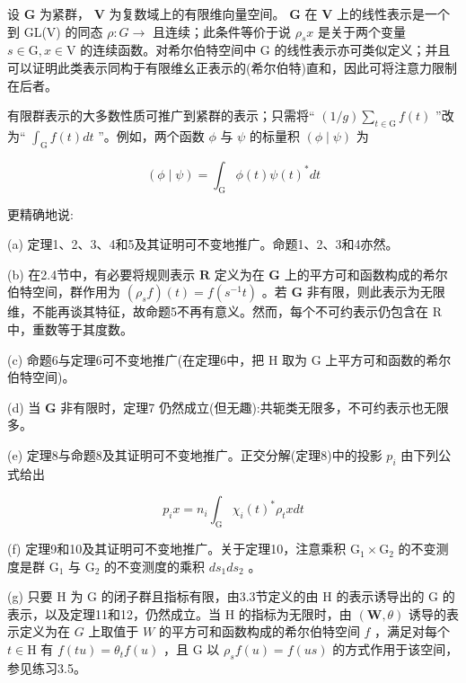\documentclass[10pt]{article}
\begin{document}
设 \(\mathbf{G}\) 为紧群， \(\mathbf{V}\) 为复数域上的有限维向量空间。 \(\mathbf{G}\) 在 \(\mathbf{V}\) 上的线性表示是一个到 GL(V) 的同态 \(\rho  : G \rightarrow\) 且连续；此条件等价于说 \({\rho }_{s}x\) 是关于两个变量 \(s \in  \mathrm{G},x \in  \mathrm{V}\) 的连续函数。对希尔伯特空间中 \(\mathrm{G}\) 的线性表示亦可类似定义；并且可以证明此类表示同构于有限维幺正表示的(希尔伯特)直和，因此可将注意力限制在后者。

有限群表示的大多数性质可推广到紧群的表示；只需将“ \(\left( {1/g}\right) \mathop{\sum }\limits_{{t \in  \mathrm{G}}}f\left( t\right)\) ”改为“ \({\int }_{\mathrm{G}}f\left( t\right) {dt}\) ”。例如，两个函数 \(\phi\) 与 \(\psi\) 的标量积 \(\left( {\phi  \mid  \psi }\right)\) 为

\[
\left( {\phi  \mid  \psi }\right)  = {\int }_{\mathrm{G}}\phi \left( t\right) \psi {\left( t\right) }^{ * }{dt}
\]

更精确地说:

(a) 定理1、2、3、4和5及其证明可不变地推广。命题1、2、3和4亦然。

(b) 在2.4节中，有必要将规则表示 \(\mathbf{R}\) 定义为在 \(\mathbf{G}\) 上的平方可和函数构成的希尔伯特空间，群作用为 \(\left( {{\rho }_{s}f}\right) \left( t\right)  = f\left( {{s}^{-1}t}\right)\) 。若 \(\mathbf{G}\) 非有限，则此表示为无限维，不能再谈其特征，故命题5不再有意义。然而，每个不可约表示仍包含在 \(\mathrm{R}\) 中，重数等于其度数。

(c) 命题6与定理6可不变地推广(在定理6中，把 H 取为 G 上平方可和函数的希尔伯特空间)。

(d) 当 \(\mathbf{G}\) 非有限时，定理7 仍然成立(但无趣):共轭类无限多，不可约表示也无限多。

(e) 定理8与命题8及其证明可不变地推广。正交分解(定理8)中的投影 \({p}_{i}\) 由下列公式给出

\[
{p}_{i}x = {n}_{i}{\int }_{\mathrm{G}}{\chi }_{i}{\left( t\right) }^{ * }{\rho }_{t}{xdt}
\]

(f) 定理9和10及其证明可不变地推广。关于定理10，注意乘积 \({\mathrm{G}}_{1} \times  {\mathrm{G}}_{2}\) 的不变测度是群 \({\mathrm{G}}_{1}\) 与 \({\mathrm{G}}_{2}\) 的不变测度的乘积 \(d{s}_{1}d{s}_{2}\) 。

(g) 只要 \(\mathrm{H}\) 为 \(\mathrm{G}\) 的闭子群且指标有限，由3.3节定义的由 \(\mathrm{H}\) 的表示诱导出的 \(\mathrm{G}\) 的表示，以及定理11和12，仍然成立。当 H 的指标为无限时，由 \(\left( {\mathbf{W},\theta }\right)\) 诱导的表示定义为在 \(G\) 上取值于 \(W\) 的平方可和函数构成的希尔伯特空间 \(f\) ，满足对每个 \(t \in  \mathrm{H}\) 有 \(f\left( {tu}\right)  = {\theta }_{t}f\left( u\right)\) ，且 \(\mathrm{G}\) 以 \({\rho }_{s}f\left( u\right)  = f\left( {us}\right)\) 的方式作用于该空间，参见练习3.5。
\end{document}
